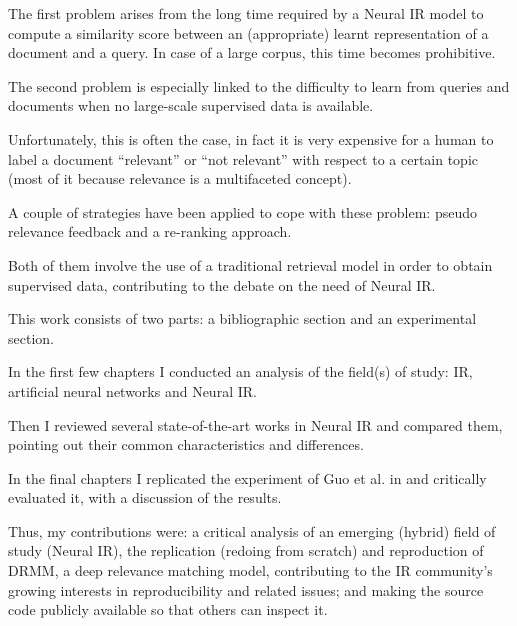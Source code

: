 The first problem arises from the long time required by a Neural IR model to compute a similarity score between an (appropriate) learnt representation of a document and a query. In case of a large corpus, this time becomes prohibitive.

The second problem is especially linked to the difficulty to learn from queries and documents when no large-scale supervised data is available.

Unfortunately, this is often the case, in fact it is very expensive for a human to label a document ``relevant'' or ``not relevant'' with respect to a certain topic (most of it because relevance is a multifaceted concept).

A couple of strategies have been applied to cope with these problem: pseudo relevance feedback and a re-ranking approach.

Both of them involve the use of a traditional retrieval model in order to obtain supervised data, contributing to the debate on the need of Neural IR.

This work consists of two parts: a bibliographic section and an experimental section.

In the first few chapters I conducted an analysis of the field(s) of study: IR, artificial neural networks and Neural IR.

Then I reviewed several state-of-the-art works in Neural IR and compared them, pointing out their common characteristics and differences.

In the final chapters I replicated the experiment of Guo et al. in \cite{drmm} and critically evaluated it, with a discussion of the results.

Thus, my contributions were: a critical analysis of an emerging (hybrid) field of study (Neural IR), the replication (redoing from scratch) and reproduction of DRMM, a deep relevance matching model, contributing to the IR community's growing interests in reproducibility and related issues; and making the source code publicly available so that others can inspect it.
